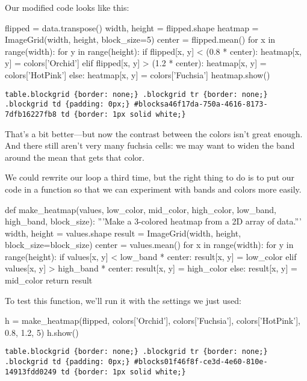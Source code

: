 \documentclass{book}
\begin{document}
Our modified code looks like this:

\begin{VerbIn}
flipped = data.transpose()
width, height = flipped.shape
heatmap = ImageGrid(width, height, block_size=5)
center = flipped.mean()
for x in range(width):
    for y in range(height):
        if flipped[x, y] < (0.8 * center):
            heatmap[x, y] = colors['Orchid']
        elif flipped[x, y] > (1.2 * center):
            heatmap[x, y] = colors['HotPink']
        else:
            heatmap[x, y] = colors['Fuchsia']
heatmap.show()
\end{VerbIn}

\begin{Verbatim}
table.blockgrid {border: none;} .blockgrid tr {border: none;} .blockgrid td {padding: 0px;} #blocksa46f17da-750a-4616-8173-7dfb16227fb8 td {border: 1px solid white;}
\end{Verbatim}

That's a bit better---but now the contrast between the colors isn't
great enough. And there still aren't very many fuchsia cells: we may
want to widen the band around the mean that gets that color.

We could rewrite our loop a third time, but the right thing to do is to
put our code in a function so that we can experiment with bands and
colors more easily.

\begin{VerbIn}
def make_heatmap(values, low_color, mid_color, high_color, low_band, high_band, block_size):
    '''Make a 3-colored heatmap from a 2D array of data.'''
    width, height = values.shape
    result = ImageGrid(width, height, block_size=block_size)
    center = values.mean()
    for x in range(width):
        for y in range(height):
            if values[x, y] < low_band * center:
                result[x, y] = low_color
            elif values[x, y] > high_band * center:
                result[x, y] = high_color
            else:
                result[x, y] = mid_color
    return result
\end{VerbIn}

To test this function, we'll run it with the settings we just used:

\begin{VerbIn}
h = make_heatmap(flipped, colors['Orchid'], colors['Fuchsia'], colors['HotPink'], 0.8, 1.2, 5)
h.show()
\end{VerbIn}

\begin{Verbatim}
table.blockgrid {border: none;} .blockgrid tr {border: none;} .blockgrid td {padding: 0px;} #blocks01f46f8f-ce3d-4e60-810e-14913fdd0249 td {border: 1px solid white;}
\end{Verbatim}
\end{document}
